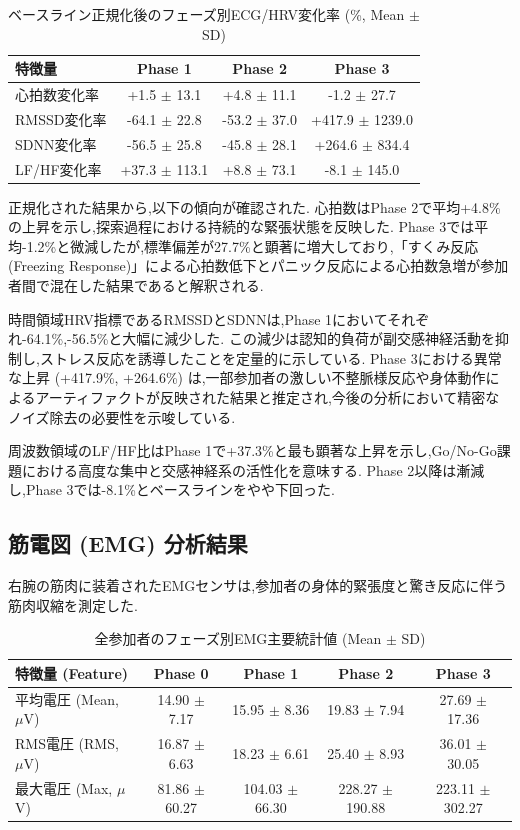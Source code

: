 \documentclass[book,paper=a4,fontsize=10pt,jafontscale=0.92]{jlreq}
\begin{document}
\begin{table}[t]
\centering
\caption{ベースライン正規化後のフェーズ別ECG/HRV変化率 (\%, Mean $\pm$ SD)}
\label{tab:ecg_hrv_normalized}
\begin{tabular}{lccc}
\hline
特徴量 & Phase 1 & Phase 2 & Phase 3 \\
\hline
心拍数変化率 & +1.5 $\pm$ 13.1 & +4.8 $\pm$ 11.1 & -1.2 $\pm$ 27.7 \\
RMSSD変化率 & -64.1 $\pm$ 22.8 & -53.2 $\pm$ 37.0 & +417.9 $\pm$ 1239.0 \\
SDNN変化率 & -56.5 $\pm$ 25.8 & -45.8 $\pm$ 28.1 & +264.6 $\pm$ 834.4 \\
LF/HF変化率 & +37.3 $\pm$ 113.1 & +8.8 $\pm$ 73.1 & -8.1 $\pm$ 145.0 \\
\hline
\end{tabular}
\end{table}

正規化された結果から,以下の傾向が確認された. 心拍数はPhase 2で平均+4.8\%の上昇を示し,探索過程における持続的な緊張状態を反映した. Phase 3では平均-1.2\%と微減したが,標準偏差が27.7\%と顕著に増大しており,「すくみ反応 (Freezing Response)」による心拍数低下とパニック反応による心拍数急増が参加者間で混在した結果であると解釈される.

時間領域HRV指標であるRMSSDとSDNNは,Phase 1においてそれぞれ-64.1\%,-56.5\%と大幅に減少した. この減少は認知的負荷が副交感神経活動を抑制し,ストレス反応を誘導したことを定量的に示している. Phase 3における異常な上昇 (+417.9\%, +264.6\%) は,一部参加者の激しい不整脈様反応や身体動作によるアーティファクトが反映された結果と推定され,今後の分析において精密なノイズ除去の必要性を示唆している.

周波数領域のLF/HF比はPhase 1で+37.3\%と最も顕著な上昇を示し,Go/No-Go課題における高度な集中と交感神経系の活性化を意味する. Phase 2以降は漸減し,Phase 3では-8.1\%とベースラインをやや下回った.



\subsection{筋電図 (EMG) 分析結果}
右腕の筋肉に装着されたEMGセンサは,参加者の身体的緊張度と驚き反応に伴う筋肉収縮を測定した.

\begin{table}[t]
\centering
\caption{全参加者のフェーズ別EMG主要統計値 (Mean $\pm$ SD)}
\label{tab:emg_stats}
\begin{tabular}{lcccc}
\hline
特徴量 (Feature) & Phase 0 & Phase 1 & Phase 2 & Phase 3 \\
\hline
平均電圧 (Mean, $\mu$V) & 14.90 $\pm$ 7.17 & 15.95 $\pm$ 8.36 & 19.83 $\pm$ 7.94 & 27.69 $\pm$ 17.36 \\
RMS電圧 (RMS, $\mu$V) & 16.87 $\pm$ 6.63 & 18.23 $\pm$ 6.61 & 25.40 $\pm$ 8.93 & 36.01 $\pm$ 30.05 \\
最大電圧 (Max, $\mu$V) & 81.86 $\pm$ 60.27 & 104.03 $\pm$ 66.30 & 228.27 $\pm$ 190.88 & 223.11 $\pm$ 302.27 \\
\hline
\end{tabular}
\end{table}
\end{document}
